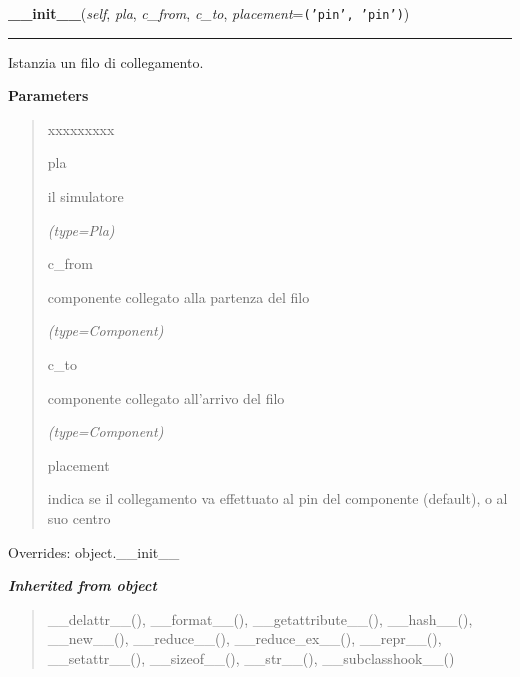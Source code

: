 \hspace{.8\funcindent}\begin{boxedminipage}{\funcwidth}

    \raggedright \textbf{\_\_init\_\_}(\textit{self}, \textit{pla}, \textit{c\_from}, \textit{c\_to}, \textit{placement}={\tt \texttt{(}\texttt{'}\texttt{pin}\texttt{'}\texttt{, }\texttt{'}\texttt{pin}\texttt{'}\texttt{)}})

    \vspace{-1.5ex}

    \rule{\textwidth}{0.5\fboxrule}
\setlength{\parskip}{2ex}
    Istanzia un filo di collegamento.

\setlength{\parskip}{1ex}
      \textbf{Parameters}
      \vspace{-1ex}

      \begin{quote}
        \begin{Ventry}{xxxxxxxxx}

          \item[pla]

          il simulatore

            {\it (type=Pla)}

          \item[c\_from]

          componente collegato alla partenza del filo

            {\it (type=Component)}

          \item[c\_to]

          componente collegato all'arrivo del filo

            {\it (type=Component)}

          \item[placement]

          indica se il collegamento va effettuato al pin del componente 
          (default), o al suo centro

        \end{Ventry}

      \end{quote}

      Overrides: object.\_\_init\_\_

    \end{boxedminipage}


\large{\textbf{\textit{Inherited from object}}}

\begin{quote}
\_\_delattr\_\_(), \_\_format\_\_(), \_\_getattribute\_\_(), \_\_hash\_\_(), \_\_new\_\_(), \_\_reduce\_\_(), \_\_reduce\_ex\_\_(), \_\_repr\_\_(), \_\_setattr\_\_(), \_\_sizeof\_\_(), \_\_str\_\_(), \_\_subclasshook\_\_()
\end{quote}

